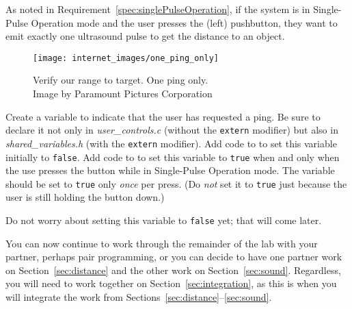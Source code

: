 As noted in Requirement~\ref{spec:singlePulseOperation}, if the system is in Single-Pulse Operation mode and the user presses the (left) pushbutton, they want to emit exactly one ultrasound pulse to get the distance to an object.
\begin{figure}[h]
    \centering
    \texttt{[image: internet\_images/one\_ping\_only]}
    \caption{Verify our range to target. One ping only. \\ \tiny Image by Paramount Pictures Corporation \label{fig:onePingOnly}}
\end{figure}

Create a variable to indicate that the user has requested a ping.
Be sure to declare it not only in \textit{user\_controls.c} (without the \lstinline{extern} modifier) but also in \textit{shared\_variables.h} (with the \lstinline{extern} modifier).
Add code to  to set this variable initially to \lstinline{false}.
Add code to  to set this variable to \lstinline{true} when and only when the use presses the button while in Single-Pulse Operation mode.
The variable should be set to \lstinline{true} only \textit{once} per press.
(Do \textit{not} set it to \lstinline{true} just because the user is still holding the button down.)

Do not worry about setting this variable to \lstinline{false} yet;
that will come later.

\vspace{1cm}

You can now continue to work through the remainder of the lab with your partner, perhaps pair programming,
or you can decide to have one partner work on Section~\ref{sec:distance} and the other work on Section~\ref{sec:sound}.
Regardless, you will need to work together on Section~\ref{sec:integration}, as this is when you will integrate the work from Sections~\ref{sec:distance}--\ref{sec:sound}.
